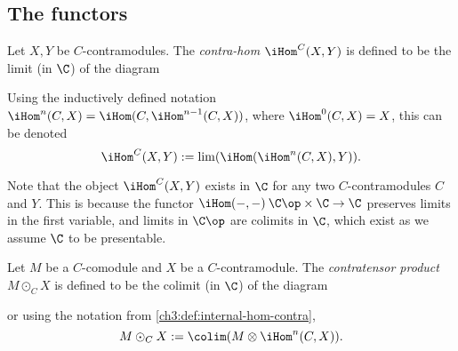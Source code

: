 
\subsection{The functors}



\begin{definition}
    Let $X, Y$ be $C$-contramodules. The \emph{contra-hom} $\iHom^C(X, Y)$ is defined to be the limit (in $\C$) of the diagram 
    \begin{center}
    \end{center}
    Using the inductively defined notation $\iHom^n(C, X) = \iHom(C, \iHom^{n-1}(C, X))$, where $\iHom^0(C, X) = X$, this can be denoted 
    \[\iHom^C(X, Y) := \lim(\iHom(\iHom^n(C, X), Y)).\]
\end{definition}

\begin{remark}
    Note that the object $\iHom^C(X, Y)$ exists in $\C$ for any two $C$-contramodules $C$ and $Y$. This is because the functor $\iHom(-,-)\: \C\op\times \C\to \C$ preserves limits in the first variable, and limits in $\C\op$ are colimits in $\C$, which exist as we assume $\C$ to be presentable. 
\end{remark}

\begin{definition}
    Let $M$ be a $C$-comodule and $X$ be a $C$-contramodule. The \emph{contratensor product} $M\odot_C X$ is defined to be the colimit (in $\C$) of the diagram 
    \begin{center}
    \end{center}
    or using the notation from \cref{ch3:def:internal-hom-contra}, 
    \[M\odot_C X := \colim(M\otimes \iHom^n(C, X)).\]
\end{definition}

